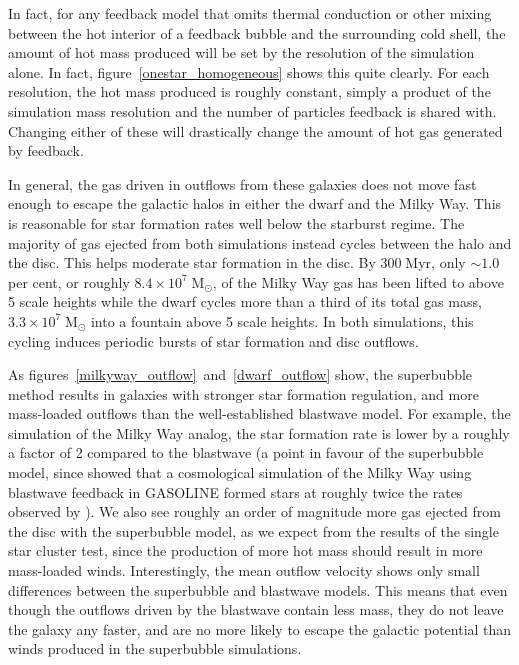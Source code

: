 In fact, for any feedback model that omits thermal conduction or other mixing
between the hot interior of a feedback bubble and the surrounding cold shell,
the amount of hot mass produced will be set by the resolution of the simulation
alone.  In fact, figure~\ref{onestar_homogeneous} shows this quite clearly.  For
each resolution, the hot mass produced is roughly constant, simply a product of
the simulation mass resolution and the number of particles feedback is shared
with.  Changing either of these will drastically change the amount of hot gas
generated by feedback.  

In general, the gas driven in outflows from these galaxies does not move fast
enough to escape the galactic halos in either the dwarf and the Milky Way.  This
is reasonable for star formation rates well below the starburst regime.  The
majority of gas ejected from both simulations instead cycles between the halo
and the disc.  This helps moderate star formation in the disc.  By
$300\;\mathrm{Myr}$, only $\sim 1.0$ per cent, or roughly
$8.4\times10^7\;\mathrm{M_\odot}$, of the Milky Way gas has been lifted to above
5 scale heights while the dwarf cycles more than a third of its total gas mass,
$3.3\times10^7\; \mathrm{M_\odot}$ into a fountain above 5 scale heights.  In
both simulations, this cycling induces periodic bursts of star formation and
disc outflows.

As figures~\ref{milkyway_outflow}~and~\ref{dwarf_outflow} show, the superbubble
method results in galaxies with stronger star formation regulation, and
more mass-loaded outflows than the well-established blastwave model.  
For example, the simulation of the Milky Way analog, the star
formation rate is lower by a roughly a factor of 2 compared to the blastwave (a
point in favour of the superbubble model, since \citet{Scannapieco2012} showed
that a cosmological simulation of the Milky Way using blastwave feedback in
{\sc GASOLINE} formed stars at roughly twice the rates observed by
\citet{Guo2011}).  We also see roughly an order of magnitude more gas ejected
from the disc with the superbubble model, as we expect from the results of the
single star cluster test, since the production of more hot mass should result in
more mass-loaded winds.  Interestingly, the mean outflow velocity shows only
small differences between the superbubble and blastwave models.  This means that
even though the outflows driven by the blastwave contain less mass, they do not
leave the galaxy any faster, and are no more likely to escape the galactic
potential than winds produced in the superbubble simulations.

